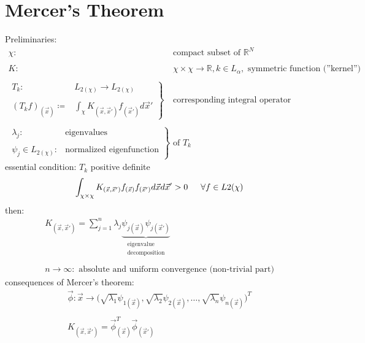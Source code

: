 \documentclass[a4paper,11pt]{article}
\begin{document}
\section{Mercer's Theorem}
Preliminaries:
\[ \begin{array}{ll}
	\chi: & \text{compact subset of } \mathbb{R}^N \\\\
	K: & \chi \times \chi \rightarrow \mathbb{R}, k \in L_\alpha,
		\text{ symmetric function (''kernel'')} \\\\
	\left. \begin{array}{ll}
	T_k: & L_{2 (\chi)} \rightarrow L_{2 (\chi)} \\\\
	(T_k f)_{(\vec{x})} \coloneqq & \int_\chi K_{(\vec{x},\vec{x}')}
		f_{(\vec{x}')} d \vec{x}'
	\end{array} \right \} & \text{corresponding integral operator} \\\\
	\left. \begin{array}{ll}
	\lambda_j: & \text{eigenvalues} \\\\
	\psi_j \in L_{2 (\chi)}:	& \text{normalized eigenfunction}
	\end{array} \right \} & \text{of } T_k
\end{array} \]
essential condition: $T_k$ positive definite
\begin{equation}
	\int_{\chi \times \chi} K_{(\vec{x}, \vec{x}')} f_{(\vec{x})}
		f_{(\vec{x}')} d \vec{x} d \vec{x}' > 0 
	\indent \forall f \in L{2 (\chi)}
\end{equation}
then:
\begin{equation}
	\begin{array}{l}
	K_{(\vec{x}, \vec{x}')} = \sum\limits_{j = 1}^n \lambda_j 
		\underbrace{ \psi_{j (\vec{x})} \psi_{j (\vec{x}')} }_{
			\substack{\text{eigenvalue} \\ \text{decomposition}}}
			\\\\
	n \rightarrow \infty: \text{ absolute and uniform convergence 
		(non-trivial part)}
	\end{array}
\end{equation}
consequences of Mercer's theorem:
\begin{equation}
	\begin{array}{l}
	\vec{\phi}: \vec{x} \rightarrow 
		\big( \sqrt{\lambda_1} \psi_{1(\vec{x})},
		\sqrt{\lambda_2} \psi_{2(\vec{x})}, \ldots,
		\sqrt{\lambda_n} \psi_{n(\vec{x})}
		\big)^T \\\\
	K_{(\vec{x}, \vec{x}')} = \vec{\phi}_{(\vec{x})}^T 
		\vec{\phi}_{(\vec{x}')}
	\end{array}
\end{equation}
\end{document}
